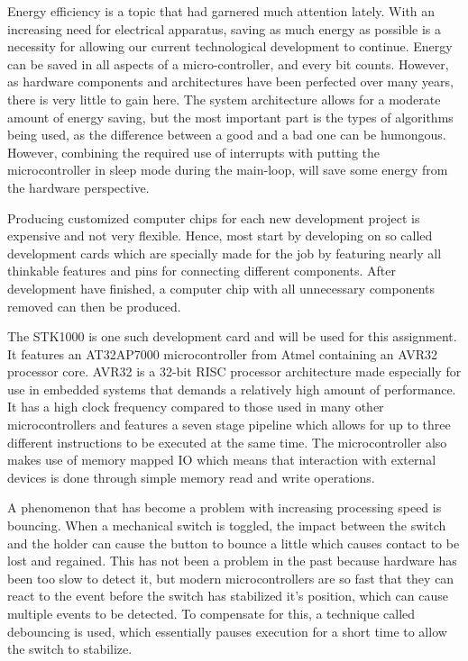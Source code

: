 Energy efficiency is a topic that had garnered much attention lately. With an increasing need for electrical apparatus, saving as much energy as possible is a necessity for allowing our current technological development to continue. Energy can be saved in all aspects of a micro-controller, and every bit counts. However, as hardware components and architectures have been perfected over many years, there is very little to gain here. The system architecture allows for a moderate amount of energy saving, but the most important part is the types of algorithms being used, as the difference between a good and a bad one can be humongous. However, combining the required use of interrupts with putting the microcontroller in sleep mode during the main-loop, will save some energy from the hardware perspective. 

Producing customized computer chips for each new development project is expensive and not very flexible. Hence, most start by developing on so called development cards which are specially made for the job by featuring nearly all thinkable features and pins for connecting different components. After development have finished, a computer chip with all unnecessary components removed can then be produced.

The STK1000 is one such development card and will be used for this assignment. It features an AT32AP7000 microcontroller from Atmel containing an AVR32 processor core. AVR32 is a 32-bit RISC processor architecture made especially for use in embedded systems that demands a relatively high amount of performance. It has a high clock frequency compared to those used in many other microcontrollers and features a seven stage pipeline which allows for up to three different instructions to be executed at the same time. The microcontroller also makes use of memory mapped IO which means that interaction with external devices is done through simple memory read and write operations.

A phenomenon that has become a problem with increasing processing speed is bouncing. When a mechanical switch is toggled, the impact between the switch and the holder can cause the button to bounce a little which causes contact to be lost and regained. This has not been a problem in the past because hardware has been too slow to detect it, but modern microcontrollers are so fast that they can react to the event before the switch has stabilized it’s position, which can cause multiple events to be detected. To compensate for this, a technique called debouncing is used, which essentially pauses execution for a short time to allow the switch to stabilize.

